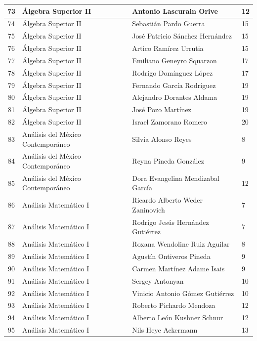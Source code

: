 {\begin{longtable}{|c|p{6.5cm}|p{5cm}|p{1.5cm}|}
  73 & Álgebra Superior II & Antonio Lascurain Orive & 12 \\ \hline 
  74 & Álgebra Superior II & Sebastián Pardo Guerra & 15 \\ \hline 
  75 & Álgebra Superior II & José Patricio Sánchez Hernández & 15 \\ \hline 
  76 & Álgebra Superior II & Artico Ramírez Urrutia & 15 \\ \hline 
  77 & Álgebra Superior II & Emiliano Geneyro Squarzon & 17 \\ \hline 
  78 & Álgebra Superior II & Rodrigo Domínguez López & 17 \\ \hline 
  79 & Álgebra Superior II & Fernando García Rodríguez & 19 \\ \hline 
  80 & Álgebra Superior II & Alejandro Dorantes Aldama & 19 \\ \hline 
  81 & Álgebra Superior II & José Pozo Martínez & 19 \\ \hline 
  82 & Álgebra Superior II & Israel Zamorano Romero & 20 \\ \hline 
  83 & Análisis del México Contemporáneo & Silvia Alonso Reyes & 8 \\ \hline 
  84 & Análisis del México Contemporáneo & Reyna Pineda González & 9 \\ \hline 
  85 & Análisis del México Contemporáneo & Dora Evangelina Mendizabal García & 12 \\ \hline 
  86 & Análisis Matemático I & Ricardo Alberto Weder Zaninovich & 7 \\ \hline 
  87 & Análisis Matemático I & Rodrigo Jesús Hernández Gutiérrez & 7 \\ \hline 
  88 & Análisis Matemático I & Roxana Wendoline Ruiz Aguilar & 8 \\ \hline 
  89 & Análisis Matemático I & Agustín Ontiveros Pineda & 9 \\ \hline 
  90 & Análisis Matemático I & Carmen Martínez Adame Isais & 9 \\ \hline 
  91 & Análisis Matemático I & Sergey Antonyan & 10 \\ \hline 
  92 & Análisis Matemático I & Vinicio Antonio Gómez Gutiérrez & 10 \\ \hline 
  93 & Análisis Matemático I & Roberto Pichardo Mendoza & 12 \\ \hline 
  94 & Análisis Matemático I & Alberto León Kushner Schnur & 12 \\ \hline 
  95 & Análisis Matemático I & Nils Heye Ackermann & 13 \\ \hline 

\end{longtable}}
